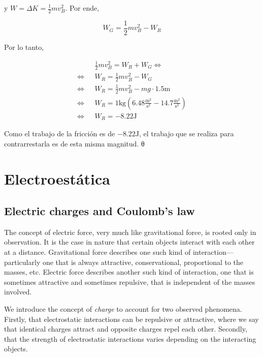 \documentclass[12pt]{article}
\theoremstyle{definition}
\begin{document}
y $W = \Delta K = \frac{1}{2}mv_B^2$. Por ende, 

\begin{equation*}
    W_G = \frac{1}{2}mv_B^2 - W_R
\end{equation*}

Por lo tanto, 

\begin{align*}
    &\frac{1}{2}mv_B^2  = W_R + W_G \iff \\ 
    \iff ~ ~ ~ 
    &W_R = \frac{1}{2}mv_B^2 - W_G\\ 
    \iff ~ ~ ~ 
    &W_R = \frac{1}{2}mv_B^2 - mg \cdot 1.5\text{m} \\ 
    \iff ~ ~ ~  
    &W_R = \text{1kg}\left( 6.48 \frac{\text{m}^2}{\text{s}^2} - 14.7
    \frac{\text{m}^2}{\text{s}^2} \right) \\ 
    \iff &W_R = -8.22\text{J}
\end{align*}

Como el trabajo de la fricción es de $-8.22\text{J}$, el trabajo que se realiza
para contrarrestarla es de esta misma magnitud. θ


\pagebreak 


\section{Electroestática}

\subsection{Electric charges and Coulomb's law}

The concept of electric force, very much like gravitational force, is rooted
only in observation. It is the case in nature that certain objects interact with
each other at a distance. Gravitational force describes one such kind of
interaction—particularly one that is always attractive, conservational,
proportional to the masses, etc. Electric force describes another such kind of
interaction, one that is sometimes attractive and sometimes repulsive, that is
independent of the masses involved. 

We introduce the concept of \textit{charge} to account for two observed
phenomena. Firstly, that electrostatic interactions can be repulsive or
attractive, where we say that identical charges attract and opposite charges
repel each other. Secondly, that the strength of electrostatic interactions
varies depending on the interacting objects.
\end{document}
